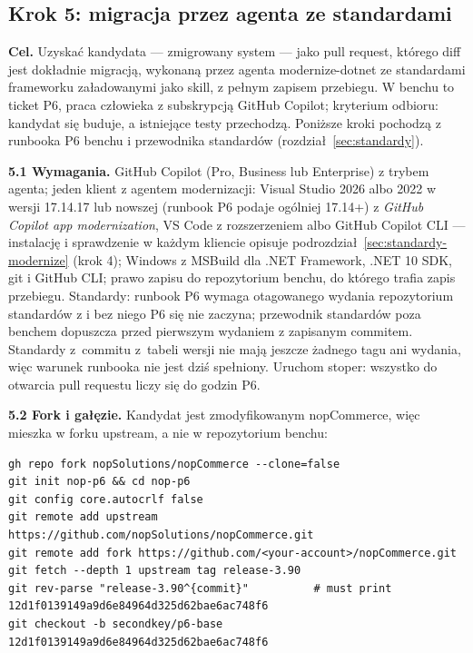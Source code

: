 
\subsection{Krok 5: migracja przez agenta ze standardami}\label{sec:procedura-krok5}

\textbf{Cel.} Uzyskać kandydata --- zmigrowany system --- jako pull request, którego diff
jest dokładnie migracją, wykonaną przez agenta modernize-dotnet ze standardami
frameworku załadowanymi jako skill, z pełnym zapisem przebiegu. W benchu to ticket P6,
praca człowieka z subskrypcją GitHub Copilot; kryterium odbioru: kandydat się buduje, a
istniejące testy przechodzą. Poniższe kroki pochodzą z runbooka P6 benchu i przewodnika
standardów (rozdział~\ref{sec:standardy}).

\textbf{5.1 Wymagania.} GitHub Copilot (Pro, Business lub Enterprise) z trybem agenta;
jeden klient z agentem modernizacji: Visual Studio 2026 albo 2022 w wersji 17.14.17 lub
nowszej (runbook P6 podaje ogólniej 17.14+) z \emph{GitHub Copilot app modernization},
VS Code z rozszerzeniem albo GitHub Copilot CLI --- instalację i sprawdzenie w każdym
kliencie opisuje podrozdział~\ref{sec:standardy-modernize} (krok 4); Windows z MSBuild dla
.NET Framework, .NET 10 SDK, git i GitHub CLI; prawo zapisu do repozytorium benchu, do
którego trafia zapis przebiegu. Standardy: runbook P6 wymaga otagowanego wydania
repozytorium standardów z  i bez niego P6 się nie zaczyna;
przewodnik standardów poza benchem dopuszcza przed pierwszym wydaniem 
z zapisanym commitem. Standardy z~commitu z~tabeli wersji nie mają jeszcze żadnego tagu ani
wydania, więc warunek runbooka nie jest dziś spełniony. Uruchom stoper: wszystko do otwarcia pull requestu liczy się do
godzin P6.

\textbf{5.2 Fork i gałęzie.} Kandydat jest zmodyfikowanym nopCommerce, więc mieszka w
forku upstream, a nie w repozytorium benchu:

\begin{lstlisting}
gh repo fork nopSolutions/nopCommerce --clone=false
git init nop-p6 && cd nop-p6
git config core.autocrlf false
git remote add upstream https://github.com/nopSolutions/nopCommerce.git
git remote add fork https://github.com/<your-account>/nopCommerce.git
git fetch --depth 1 upstream tag release-3.90
git rev-parse "release-3.90^{commit}"          # must print 12d1f0139149a9d6e84964d325d62bae6ac748f6
git checkout -b secondkey/p6-base 12d1f0139149a9d6e84964d325d62bae6ac748f6
\end{lstlisting}

